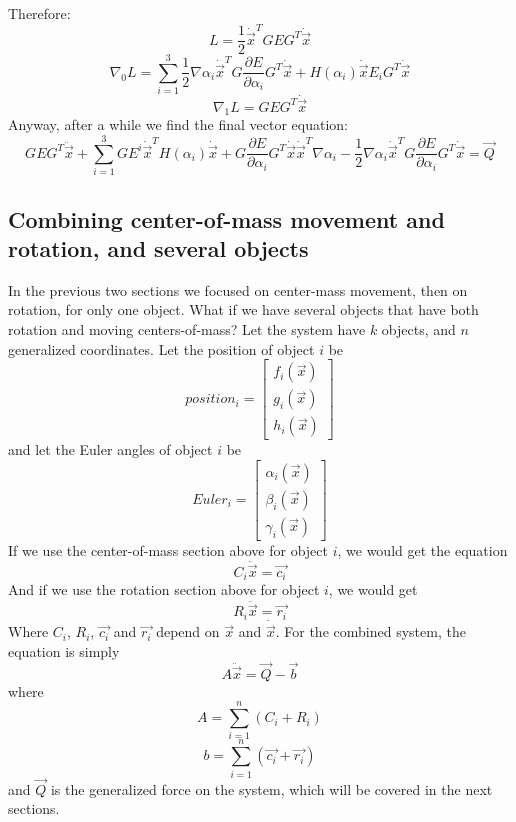 \documentclass{article}
\begin{document}
Therefore:
\[
L = \frac{1}{2} \dot{\overrightarrow{x}}^T G E G^T \dot{\overrightarrow{x}}
\]\[
\nabla_0 L = \sum_{i=1}^3 \frac{1}{2} \nabla \alpha_i \dot{\overrightarrow{x}}^T G \frac{\partial E}{\partial \alpha_i} G^T \dot{\overrightarrow{x}}
+ H(\alpha_i) \dot{\overrightarrow{x}} E_i G^T \dot{\overrightarrow{x}}
\]\[
\nabla_1 L = G E G^T \dot{\overrightarrow{x}}
\]
Anyway, after a while we find the final vector equation:
\[
G E G^T \ddot{\overrightarrow{x}} + \sum_{i=1}^{3} G E^i \dot{\overrightarrow{x}}^T H(\alpha_i) \dot{\overrightarrow{x}} +
G \frac{\partial E}{\partial \alpha_i} G^T \dot{\overrightarrow{x}} \dot{\overrightarrow{x}}^T \nabla \alpha_i -
\frac{1}{2} \nabla \alpha_i \dot{\overrightarrow{x}}^T G \frac{\partial E}{\partial \alpha_i} G^T \dot{\overrightarrow{x}}
= \overrightarrow{Q}
\]

\subsection{Combining center-of-mass movement and rotation, and several objects}
In the previous two sections we focused on center-mass movement, then on rotation, for only one object.
What if we have several objects that have both rotation and moving centers-of-mass?
Let the system have \(k\) objects, and \(n\) generalized coordinates. Let the position of object \(i\) be
\[ position_i = \begin{bmatrix} f_i(\overrightarrow{x}) \\ g_i(\overrightarrow{x}) \\ h_i(\overrightarrow{x}) \end{bmatrix} \]
and let the Euler angles of object \(i\) be
\[ Euler_i = \begin{bmatrix} \alpha_i(\overrightarrow{x}) \\ \beta_i(\overrightarrow{x}) \\ \gamma_i(\overrightarrow{x}) \end{bmatrix} \]
If we use the center-of-mass section above for object \(i\), we would get the equation
\[ C_i \ddot{\overrightarrow{x}} = \overrightarrow{c_i} \]
And if we use the rotation section above for object \(i\), we would get
\[ R_i \ddot{\overrightarrow{x}} = \overrightarrow{r_i} \]
Where \(C_i\), \(R_i\), \(\overrightarrow{c_i}\) and \(\overrightarrow{r_i}\) depend on \(\overrightarrow{x}\) and \(\dot{\overrightarrow{x}}\).
For the combined system, the equation is simply
\[ A \ddot{\overrightarrow{x}} = \overrightarrow{Q} - \overrightarrow{b} \]
where
\[ A = \sum_{i=1}^{n} (C_i + R_i) \]
\[ b = \sum_{i=1}^{n} (\overrightarrow{c_i} + \overrightarrow{r_i}) \]
and \(\overrightarrow{Q}\) is the generalized force on the system, which will be covered in the next sections.
\end{document}
